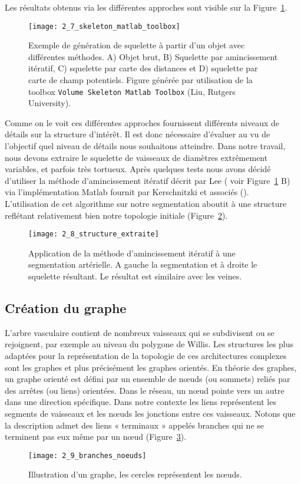 Les résultats obtenus via les différentes approches sont visible sur la Figure~\ref{fig:2_7_skeleton_matlab_toolbox}. 
\begin{figure}[!t]
\centering
\texttt{[image: 2\_7\_skeleton\_matlab\_toolbox]}
\caption{Exemple de génération de squelette à partir d'un objet avec différentes méthodes. A) Objet brut, B) Squelette par amincissement itératif, C) squelette par carte des distances et D) squelette par carte de champ potentiels. Figure générée par utilisation de la toolbox {\tt Volume Skeleton Matlab Toolbox} (Liu, Rutgers University).}
\label{fig:2_7_skeleton_matlab_toolbox}	
\end{figure}	
Comme on le voit ces différentes approches fournissent différents niveaux de détails sur la structure d’intérêt. Il est donc nécessaire d’évaluer au vu de l’objectif quel niveau de détails nous souhaitons atteindre. Dans notre travail, nous devons extraire le squelette de vaisseaux de diamètres extrêmement variables, et parfois très tortueux. Après quelques tests nous avons décidé d’utiliser la méthode d’amincissement itératif décrit par Lee (\cite{Lee1994} voir Figure~\ref{fig:2_7_skeleton_matlab_toolbox} B) via l’implémentation Matlab fournit par Kerschnitzki et associés (\cite{Kerschnitzki2013}).\\

L’utilisation de cet algorithme sur notre segmentation aboutit à une structure reflétant relativement bien notre topologie initiale (Figure~\ref{fig:2_8_structure_extraite}).
\begin{figure}[!t]
\centering
\texttt{[image: 2\_8\_structure\_extraite]}
\caption{Application de la méthode d'amincissement itératif à une segmentation artérielle. A gauche la segmentation et à droite le squelette résultant. Le résultat est similaire avec les veines.}
\label{fig:2_8_structure_extraite}	
\end{figure}	
\subsection{Création du graphe}
\label{sect:graph_creation}
L’arbre vasculaire contient de nombreux vaisseaux qui se subdivisent ou se rejoignent,  par exemple au niveau du polygone de Willis. Les structures les plus adaptées pour la représentation de la topologie de ces architectures complexes sont les graphes et plus précisément les graphes orientés. En théorie des graphes, un graphe orienté est défini par un ensemble de nœuds (ou sommets) reliés par des arrêtes (ou liens) orientées. Dans le réseau, un nœud pointe vers un autre dans une direction spécifique. Dans notre contexte les liens représentent les segments de vaisseaux et les nœuds les jonctions entre ces vaisseaux. Notons que la description admet des liens « terminaux » appelés branches qui ne se terminent pas eux même par un nœud (Figure~\ref{fig:2_9_branches_noeuds}).\\
\begin{figure}[!t]
\centering
\texttt{[image: 2\_9\_branches\_noeuds]}
\caption{Illustration d'un graphe, les cercles représentent les nœuds.}
\label{fig:2_9_branches_noeuds}	
\end{figure}	

